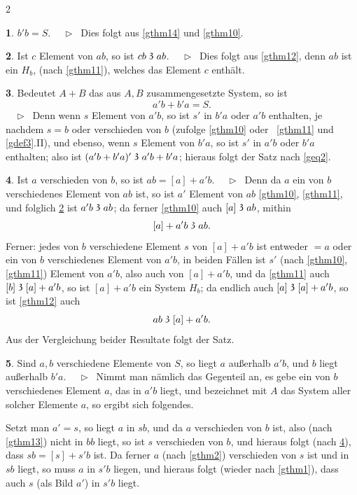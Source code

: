 \documentclass[leqno,hidelinks,10pt]{article}
\theoremstyle{definition}
\newtheorem{satz}{\protect\satzname}
\newcommand{\satzname}{}
\renewcommand{\satzname}{\hspace{-4pt}.\ Satz}%
\renewcommand{\satzname}{\hspace{-4pt}.\ Theorem}%
\newcommand\Beweis{\medskip \newline $ \phantom{'.'} \rhd \ $}%
\newcommand\beweis{ $ \phantom{'.'} \rhd \ $}%
\newcommand\TeilVon{\mathrel{\raisebox{0.45ex}{$\mathfrak{3}$}}}
\newcommand{\sref}[1]{\underline{\ref{#1}}}%
\begin{document}
\begin{paracol}{2}
\begin{leftcolumn}
\begin{satz}\label{gthm15}
$b' b = S$.
\Beweis
Dies folgt aus \sref{gthm14} und \sref{gthm10}.
\end{satz}

\begin{satz}\label{gthm16}
Ist $c$ Element von $ab$, so ist $cb \TeilVon ab$.
\Beweis
Dies folgt aus \sref{gthm12}, denn $ab$ ist ein $H_b$,
(nach \sref{gthm11}), welches das Element $c$ enthält.
\end{satz}

\begin{satz}\label{gthm17}
Bedeutet $A + B$ das aus $A, B$ zusammengesetzte System, so ist
\[
    a'b + b'a = S.
\]%
\beweis
Denn wenn $s$ Element von $a'b$, so ist $s'$ in $b'a$ oder $a'b$
enthalten, je nachdem $s = b$ oder verschieden von $b$ (zufolge \sref{gthm10}
oder ~\sref{gthm11} und \sref{gdef3}.II), und ebenso, wenn $s$ Element von
$b'a$, so ist $s'$ in $a'b$ oder $b'a$ enthalten; also ist
$(a'b + b'a)' \TeilVon a'b + b'a$; hieraus folgt der Satz nach \eqref{geq2}.
\end{satz}

\begin{satz}\label{gthm18}
Ist $a$ verschieden von $b$, so ist $ab = [a] + a'b$.
\Beweis
Denn da $a$ ein von $b$ verschiedenes Element von $ab$ ist, so ist $a'$ Element
von $ab$ \sref{gthm10}, \sref{gthm11}, und folglich \sref{gthm16} ist
$a'b \TeilVon ab$; da ferner \sref{gthm10} auch $[a] \TeilVon ab$, mithin
\[
    [a] + a'b \TeilVon ab.
\]
Ferner: jedes von $b$ verschiedene Element $s$ von $[a] + a'b$ ist entweder
$= a$ oder ein von $b$ verschiedenes Element von $a'b$, in beiden Fällen ist
$s'$ (nach \sref{gthm10}, \sref{gthm11}) Element von $a'b$, also auch von
$[a]+ a'b$, und da \sref{gthm11} auch $[b] \TeilVon [a] + a'b$, so ist
$[a] + a'b$ ein System $H_b$; da endlich auch $[a] \TeilVon [a] + a'b$, so ist
\sref{gthm12} auch
\[
    ab \TeilVon [a] + a' b.
\]
Aus der Vergleichung beider Resultate folgt der Satz.
\end{satz}

\newpage

\begin{satz}\label{gthm19}
Sind $a, b$ verschiedene Elemente von $S$, so liegt $a$ außerhalb $a'b$,
und $b$ liegt außerhalb $b'a$.
\Beweis
Nimmt man nämlich das Gegenteil an, es gebe ein von $b$ verschiedenes
Element $a$, das in $a'b$ liegt, und bezeichnet mit $A$ das System aller
solcher Elemente $a$, so ergibt sich folgendes.

Setzt man $a' = s$, so liegt $a$ in $sb$, und da $a$ verschieden von $b$ ist, also
(nach \sref{gthm13}) nicht in $bb$ liegt, so ist $s$ verschieden von $b$, und
hieraus folgt (nach \sref{gthm18}), dass $sb = [s] + s'b$ ist. Da ferner $a$
(nach \sref{gthm2}) verschieden von $s$ ist und in $sb$ liegt, so muss $a$ in
$s'b$ liegen, und hieraus folgt (wieder nach \sref{gthm1}), dass auch $s$
(als Bild $a'$) in $s'b$ liegt.


\end{satz}
\end{leftcolumn}
\end{paracol}
\end{document}
